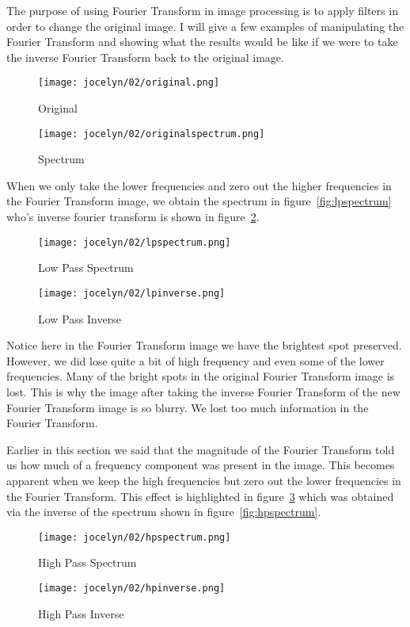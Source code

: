 \documentclass [../article.tex]{subfiles}
\begin{document}
  The purpose of using Fourier Transform in image processing is to
  apply filters in order to change the original image.  I will give
  a few examples of manipulating the Fourier Transform and  showing
  what the results would be like if we were to take the inverse
  Fourier Transform back to the original image.
  \begin{figure}[!htb]
      \texttt{[image: jocelyn/02/original.png]}
      \caption{Original}
      \label{fig:original2}
    \endminipage\hfill
      \texttt{[image: jocelyn/02/originalspectrum.png]}
      \caption{Spectrum}
      \label{fig:spectrum2}
    \endminipage
  \end{figure}

  When we only take the lower frequencies and zero out the higher
  frequencies in the Fourier Transform image, we obtain the spectrum
  in figure~\ref{fig:lpspectrum} who's inverse fourier transform
  is shown in figure~\ref{fig:lpinverse}.
  \begin{figure}[!htb]
      \texttt{[image: jocelyn/02/lpspectrum.png]}
      \caption{Low Pass Spectrum}
      \label{fig:lpspectrum}
    \endminipage\hfill
      \texttt{[image: jocelyn/02/lpinverse.png]}
      \caption{Low Pass Inverse}
      \label{fig:lpinverse}
    \endminipage
  \end{figure}
  Notice here in the Fourier Transform image we have the brightest
  spot preserved.  However, we did lose quite a bit of high
  frequency and even some of the lower frequencies.  Many of the
  bright spots in the original Fourier Transform image is lost.
  This is why the image after taking the inverse Fourier Transform
  of the new Fourier Transform image is so blurry.  We lost too much
  information in the Fourier Transform.

  Earlier in this section we said that the magnitude of the Fourier
  Transform told us how much of a frequency component was present in
  the image.  This becomes apparent when we keep the high
  frequencies but zero out the lower frequencies in the Fourier
  Transform. This effect is highlighted in figure~\ref{fig:hpinverse}
  which was obtained via the inverse of the spectrum shown in
  figure~\ref{fig:hpspectrum}.
  \begin{figure}[!htb]
      \texttt{[image: jocelyn/02/hpspectrum.png]}
      \caption{High Pass Spectrum}
      \label{fig:hpspectrum}
    \endminipage\hfill
      \texttt{[image: jocelyn/02/hpinverse.png]}
      \caption{High Pass Inverse}
      \label{fig:hpinverse}
    \endminipage
  \end{figure}
\end{document}
